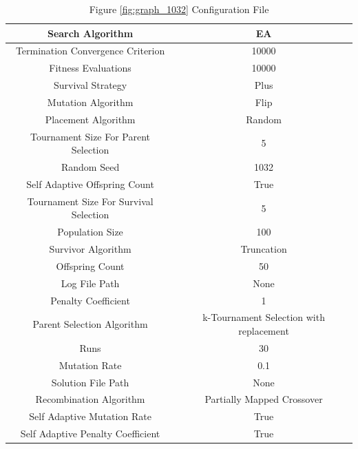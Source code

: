 \documentclass{standalone}
\begin{document}
\begin{table}[!htb]
	\centering
	\caption{Figure \ref{fig:graph_1032} Configuration File}
	\label{tab:graph_1032}
	\begin{tabular}{| c | c |}
		\hline
		Search Algorithm		& EA		 \\
		\hline
		Termination Convergence Criterion		& 10000		 \\
		\hline
		Fitness Evaluations		& 10000		 \\
		\hline
		Survival Strategy		& Plus		 \\
		\hline
		Mutation Algorithm		& Flip		 \\
		\hline
		Placement Algorithm		& Random		 \\
		\hline
		Tournament Size For Parent Selection		& 5		 \\
		\hline
		Random Seed		& 1032		 \\
		\hline
		Self Adaptive Offspring Count		& True		 \\
		\hline
		Tournament Size For Survival Selection		& 5		 \\
		\hline
		Population Size		& 100		 \\
		\hline
		Survivor Algorithm		& Truncation		 \\
		\hline
		Offspring Count		& 50		 \\
		\hline
		Log File Path		& None		 \\
		\hline
		Penalty Coefficient		& 1		 \\
		\hline
		Parent Selection Algorithm		& k-Tournament Selection with replacement		 \\
		\hline
		Runs		& 30		 \\
		\hline
		Mutation Rate		& 0.1		 \\
		\hline
		Solution File Path		& None		 \\
		\hline
		Recombination Algorithm		& Partially Mapped Crossover		 \\
		\hline
		Self Adaptive Mutation Rate		& True		 \\
		\hline
		Self Adaptive Penalty Coefficient		& True		 \\
		\hline
	\end{tabular}
\end{table}
\end{document}

